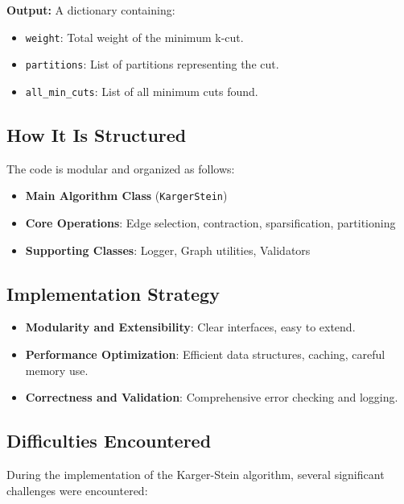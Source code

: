 \documentclass[11pt]{article}
\begin{document}
\textbf{Output:} A dictionary containing:
\begin{itemize}
    \item \texttt{weight}: Total weight of the minimum k-cut.
    \item \texttt{partitions}: List of partitions representing the cut.
    \item \texttt{all\_min\_cuts}: List of all minimum cuts found.
\end{itemize}

\subsection{How It Is Structured}
The code is modular and organized as follows:
\begin{itemize}
    \item \textbf{Main Algorithm Class} (\texttt{KargerStein})
    \item \textbf{Core Operations}: Edge selection, contraction, sparsification, partitioning
    \item \textbf{Supporting Classes}: Logger, Graph utilities, Validators
\end{itemize}

\subsection{Implementation Strategy}
\begin{itemize}
    \item \textbf{Modularity and Extensibility}: Clear interfaces, easy to extend.
    \item \textbf{Performance Optimization}: Efficient data structures, caching, careful memory use.
    \item \textbf{Correctness and Validation}: Comprehensive error checking and logging.
\end{itemize}

\subsection{Difficulties Encountered}

During the implementation of the Karger-Stein algorithm, several significant challenges were encountered:
\end{document}
